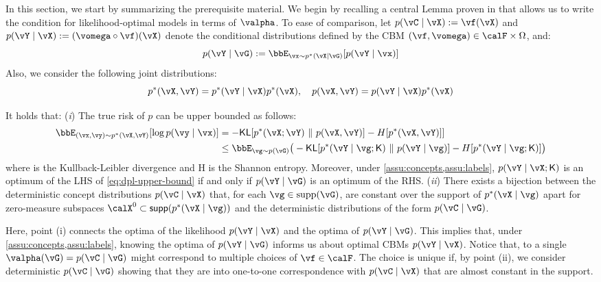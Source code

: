 In this section, we start by summarizing the prerequisite material.  We begin by recalling a central Lemma proven in \citep{marconato2023not} that allows us to write the condition for likelihood-optimal models in terms of $\valpha$. 
To ease of comparison, 
let $p (\vC \mid \vX) := \vf(\vX)$ and $p(\vY \mid \vX) := (\vomega \circ \vf) (\vX)$ denote the conditional distributions defined by the CBM $(\vf, \vomega) \in \calF \times \Omega$, and:
\[
    p(\vY \mid \vG) := \bbE_{\vx \sim p^*(\vX \mid \vG)} [ p (\vY \mid \vx) ]
\]
Also, we consider the following joint distributions:
\[
    p^*(\vX, \vY) = p^*(\vY \mid \vX) p^*(\vX), \quad p(\vX, \vY) = p(\vY \mid \vX) p^*(\vX)
\]


\begin{lemma}
    \label{lemma:abstraction-from-lh}
    It holds that:
    (\textit{i})  The true risk of $p$ can be upper bounded as follows:
    \begin{align}
    \textstyle
        \bbE_{(\vx, \vy) \sim p^*(\vX , \vY)} [
            \log p(\vy \mid \vx)
        ] 
        &= - \KL[ p^*(\vX; \vY) \ \| \ p(\vX, \vY)  ] - H[ p^*(\vX, \vY) ]
        ] 
        \\
        &\leq
        \bbE_{\vg \sim p(\vG)} \big(
            - \KL [ p^*(\vY \mid \vg; \BK) \ \| \ p(\vY \mid \vg) ] - H [ p^*(\vY \mid \vg; \BK) ]
        \big)
    \label{eq:dpl-upper-bound}
    \end{align}
    where 
    \KL is the Kullback-Leibler divergence and H is the Shannon entropy.  Moreover, under \cref{assu:concepts,assu:labels}, $p(\vY \mid \vX; \BK)$ is an optimum of the LHS of \cref{eq:dpl-upper-bound} if and only if $p(\vY \mid \vG)$ is an optimum of the RHS.
    (\textit{ii}) There exists a bijection between the deterministic concept distributions $p(\vC \mid \vX)$ that, for each $\vg \in \mathrm{supp}(\vG)$, are constant over the support of $p^*(\vX \mid \vg)$ apart for zero-measure subspaces $\calX^0 \subset \mathsf{supp}{( p^*(\vX \mid \vg))}$
    and the deterministic distributions of the form $p(\vC \mid \vG)$.
\end{lemma}

Here, point (i) connects the optima of the likelihood $p (\vY \mid \vX)$ and the optima of $p (\vY \mid \vG)$. This implies that, under \cref{assu:concepts,assu:labels}, knowing the optima of $p (\vY \mid \vG)$ informs us about optimal CBMs $p (\vY \mid \vX)$.
Notice that, to a single $\valpha(\vG) = p (\vC \mid \vG)$ might correspond to multiple choices of $\vf \in \calF$. The choice is unique if, by point (ii), we consider deterministic $p(\vC \mid \vG)$ showing that they are into one-to-one correspondence with $p (\vC \mid \vX)$ that are almost constant in the support. 

